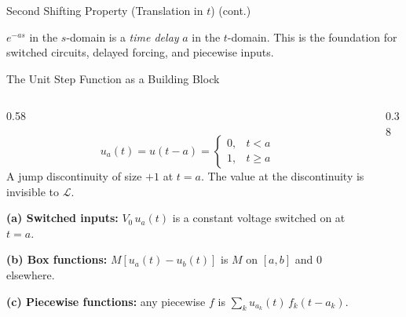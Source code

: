 \documentclass[aspectratio=169,11pt]{beamer}
\begin{document}
\begin{frame}{Second Shifting Property (Translation in $t$) (cont.)}
\footnotesize
\begin{conceptbox}
$e^{-as}$ in the $s$-domain is a \emph{time delay} $a$ in the $t$-domain. This is the foundation for switched circuits, delayed forcing, and piecewise inputs.
\end{conceptbox}
\end{frame}

\begin{frame}{The Unit Step Function as a Building Block}
\footnotesize
\begin{columns}[T]
\begin{column}{0.58\textwidth}
\begin{formulabox}[Definition]
\[u_a(t) = u(t-a) = \begin{cases} 0, & t < a \\ 1, & t \ge a \end{cases}\]
A jump discontinuity of size $+1$ at $t = a$. The value at the discontinuity is invisible to $\mathcal{L}$.
\end{formulabox}
\vspace{0.5mm}
\begin{methodbox}
\textbf{(a) Switched inputs:} $V_0\, u_a(t)$ is a constant voltage switched on at $t = a$.

\textbf{(b) Box functions:} $M[u_a(t) - u_b(t)]$ is $M$ on $[a,b]$ and $0$ elsewhere.

\textbf{(c) Piecewise functions:} any piecewise $f$ is $\sum_k u_{a_k}(t)\, f_k(t - a_k)$.
\end{methodbox}
\end{column}
\begin{column}{0.38\textwidth}
\centering
{}
\end{column}
\end{columns}
\end{frame}
\end{document}
